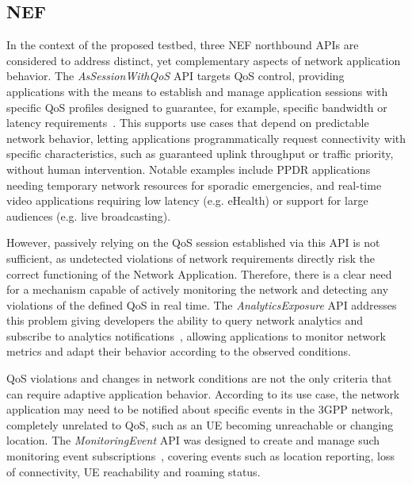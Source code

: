 \subsection{\acs{NEF}}
\label{chap:proposal:exposure:nef}

In the context of the proposed testbed, three \acs{NEF} northbound \acsp{API} are considered to address distinct, yet complementary aspects of network application behavior. The \textit{AsSessionWithQoS} \acs{API} targets \acs{QoS} control, providing applications with the means to establish and manage application sessions with specific \acs{QoS} profiles designed to guarantee, for example, specific bandwidth or latency requirements~\cite{ETSI_TS_129_122_V18_8_0}. This supports use cases that depend on predictable network behavior, letting applications programmatically request connectivity with specific characteristics, such as guaranteed uplink throughput or traffic priority, without human intervention. Notable examples include \acs{PPDR} applications needing temporary network resources for sporadic emergencies, and real-time video applications requiring low latency (e.g. eHealth) or support for large audiences (e.g. live broadcasting).

However, passively relying on the \acs{QoS} session established via this \acs{API} is not sufficient, as undetected violations of network requirements directly risk the correct functioning of the Network Application. Therefore, there is a clear need for a mechanism capable of actively monitoring the network and detecting any violations of the defined \acs{QoS} in real time. The \textit{AnalyticsExposure} \acs{API} addresses this problem giving developers the ability to query network analytics and subscribe to analytics notifications~\cite{ETSI_TS_129_522_V18_11_0}, allowing applications to monitor network metrics and adapt their behavior according to the observed conditions.

\acs{QoS} violations and changes in network conditions are not the only criteria that can require adaptive application behavior. According to its use case, the network application may need to be notified about specific events in the \acs{3GPP} network, completely unrelated to \acs{QoS}, such as an \acs{UE} becoming unreachable or changing location. The \textit{MonitoringEvent} \acs{API} was designed to create and manage such monitoring event subscriptions~\cite{ETSI_TS_129_122_V18_8_0}, covering events such as location reporting, loss of connectivity, \acs{UE} reachability and roaming status.

